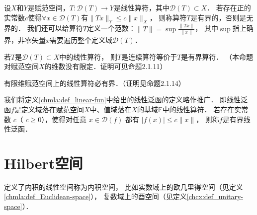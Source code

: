  
 


\begin{definition}\label{chhs:def_bound}
	设$X$和$Y$是赋范空间，$T: \mathscr{D}(T) \longrightarrow Y$是线性算符，其中$\mathscr{D}(T) \subset X$．
	若存在正的实常数$c$使得$\forall x \in \mathscr{D}(T)$有$\|T x\|_{Y} \leqslant c\|x\|_{X}$，
	则称算符$T$是{\heiti 有界的}，否则是{\heiti 无界的}．
	我们还可以给算符$T$定义一个范数：$\|T\|=\sup \frac{\|T x\|}{\|x\|}$，
	其中$\sup$指上确界，非零矢量$x$需要遍历整个定义域$\mathscr{D}(T)$．
\end{definition}

  



\begin{proposition}\label{chhs:thm_fBC}
	若$T$是$\mathscr{D}(T)\subset X$中的线性算符，
	则$T$是连续算符等价于$T$是有界算符．
	（本命题对赋范空间$X$的维数没有限定．证明可见\parencite{zhang-lin-2021}命题2.1.11）
\end{proposition}

\begin{proposition}
有限维赋范空间上的线性算符必有界．（证明见\parencite{zhang-lin-2021}命题2.1.14）
\end{proposition}


我们将定义\ref{chmla:def_linear-fun}中给出的{\kaishu 线性泛函}的定义略作推广．
即{\heiti 线性泛函}$f$是定义域落在赋范空间$X$中、值域落在$X$的基域$\mathbb{F}$中的线性算符．
若存在实常数 $c$（ $c\geqslant0$），使得对任意 $x\in\mathscr{D}(f)$ 都有 $|f(x)|\leqslant c\|x\|$，
则称$f$是{\heiti 有界线性泛函}．




\section{Hilbert空间}


  

定义了内积的线性空间称为{\heiti 内积空间}，
比如实数域上的欧几里得空间（见定义\ref{chmla:def_Euclidean-space}），
复数域上的酉空间（见定义\ref{chcx:def_unitary-space}）．

